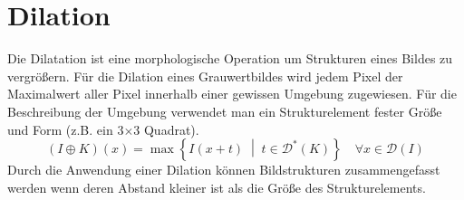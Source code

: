 \section*{Dilation}

Die Dilatation ist eine morphologische Operation um Strukturen eines Bildes zu
vergrößern.
Für die Dilation eines Grauwertbildes wird jedem Pixel der Maximalwert aller
Pixel innerhalb einer gewissen Umgebung zugewiesen.
Für die Beschreibung der Umgebung verwendet man ein Strukturelement fester Größe
und Form (z.B. ein 3$\times$3 Quadrat).
  \[ (I \oplus K)(x) =
       \max \left\{ I(x+t) \;\middle|\; t \in \mathcal{D}^*(K)\right\}
       \quad\forall x \in \mathcal{D}(I) \]
Durch die Anwendung einer Dilation können Bildstrukturen zusammengefasst werden
wenn deren Abstand kleiner ist als die Größe des Strukturelements.
